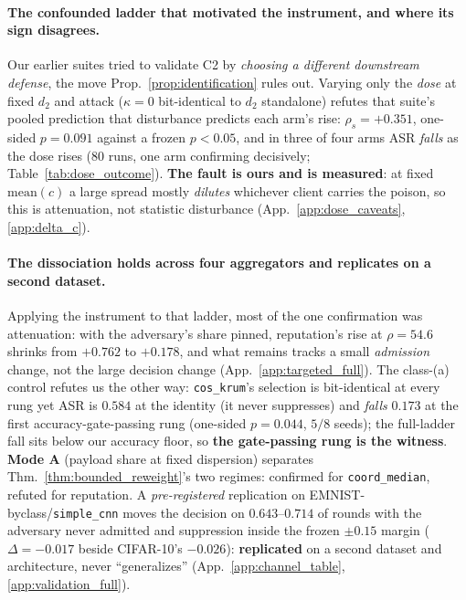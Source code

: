 \documentclass{article}
\begin{document}
\paragraph{The confounded ladder that motivated the instrument, and where its sign disagrees.}
\label{sec:dose_response}
Our earlier suites tried to validate C2 by \emph{choosing a different downstream defense}, the move Prop.~\ref{prop:identification} rules out. Varying only the \emph{dose} at fixed $d_2$ and attack ($\kappa{=}0$ bit-identical to $d_2$ standalone) refutes that suite's pooled prediction that disturbance predicts each arm's rise: $\rho_s{=}{+}0.351$, one-sided $p{=}0.091$ against a frozen $p<0.05$, and in three of four arms ASR \emph{falls} as the dose rises ($80$ runs, one arm confirming decisively; Table~\ref{tab:dose_outcome}). \textbf{The fault is ours and is measured}: at fixed $\mathrm{mean}(c)$ a large spread mostly \emph{dilutes} whichever client carries the poison, so this is attenuation, not statistic disturbance (App.~\ref{app:dose_caveats}, \ref{app:delta_c}).

\paragraph{The dissociation holds across four aggregators and replicates on a second dataset.}
\label{sec:targeted_rest}
Applying the instrument to that ladder, most of the one confirmation was attenuation: with the adversary's share pinned, reputation's rise at $\rho{=}54.6$ shrinks from $+0.762$ to $+0.178$, and what remains tracks a small \emph{admission} change, not the large decision change (App.~\ref{app:targeted_full}). The class-(a) control refutes us the other way: \texttt{cos\_krum}'s selection is bit-identical at every rung yet ASR is $0.584$ at the identity (it never suppresses) and \emph{falls} $0.173$ at the first accuracy-gate-passing rung (one-sided $p{=}0.044$, $5/8$ seeds); the full-ladder fall sits below our accuracy floor, so \textbf{the gate-passing rung is the witness}. \textbf{Mode A} (payload share at fixed dispersion) separates Thm.~\ref{thm:bounded_reweight}'s two regimes: confirmed for \texttt{coord\_median}, refuted for reputation. A \emph{pre-registered} replication on EMNIST-byclass/\texttt{simple\_cnn} moves the decision on $0.643$--$0.714$ of rounds with the adversary never admitted and suppression inside the frozen $\pm0.15$ margin ($\Delta=-0.017$ beside CIFAR-10's $-0.026$): \textbf{replicated} on a second dataset and architecture, never ``generalizes'' (App.~\ref{app:channel_table}, \ref{app:validation_full}).
\end{document}

